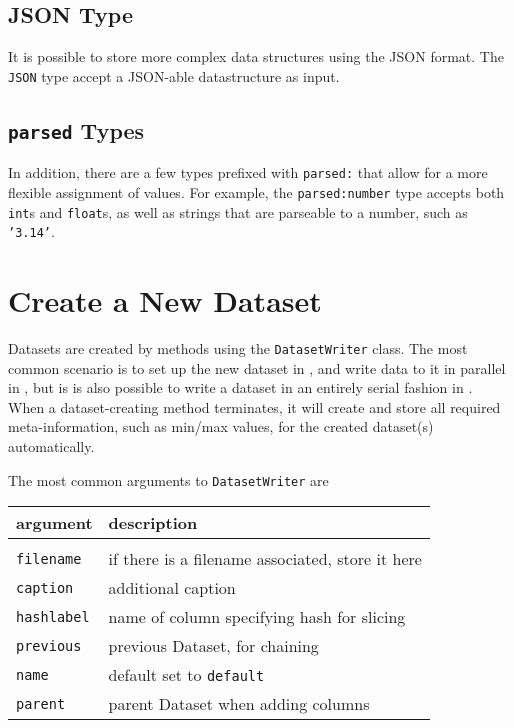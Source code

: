\subsection{JSON Type}
It is possible to store more complex data structures using the JSON
format.  The \texttt{JSON} type accept a JSON-able datastructure as
input.

\subsection{\texttt{parsed} Types}
In addition, there are a few types prefixed with \texttt{parsed:} that
allow for a more flexible assignment of values.  For example,
the \texttt{parsed:number} type accepts both \texttt{int}s
and \texttt{float}s, as well as strings that are parseable to a
number, such as \texttt{'3.14'}.



\clearpage
\section{Create a New Dataset}
Datasets are created by methods using the \texttt{DatasetWriter}
class.  The most common scenario is to set up the new dataset in
\prepare, and write data to it in parallel in \analysis, but is is
also possible to write a dataset in an entirely serial fashion in
\synthesis.  When a dataset-creating method terminates, it will create
and store all required meta-information, such as min/max values, for
the created dataset(s) automatically.

The most common arguments to \texttt{DatasetWriter} are
\begin{snugshade}
  \begin{tabular}{p{3cm} p{8cm}}
    \\
    \textbf{argument} & \textbf{description}\\[1ex]\hline\\[1ex]
    \texttt{filename}  & if there is a filename associated, store it here\\
    \texttt{caption}   & additional caption\\
    \texttt{hashlabel} & name of column specifying hash for slicing\\
    \texttt{previous}  & previous Dataset, for chaining\\
    \texttt{name}      & default set to \texttt{default}\\
    \texttt{parent}    & parent Dataset when adding columns\\
  \end{tabular}
\end{snugshade}




